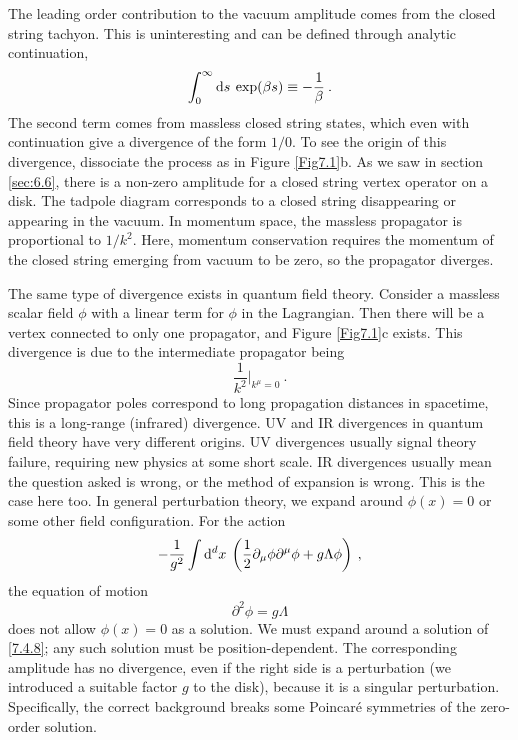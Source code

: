 The leading order contribution to the vacuum amplitude comes from the closed string tachyon. 
This is uninteresting and can be defined through analytic continuation, 
\begin{equation}
	\int_{0}^{\infty} \mathrm{d} s\:  \exp (\beta s) \equiv-\frac{1}{\beta} \:. \label{7.4.5} 
\end{equation}
The second term comes from massless closed string states, which even with continuation give a divergence of the form $1 / 0$. To see the origin of this divergence, dissociate the process as in Figure \ref{Fig7.1}b. As we saw in section \ref{sec:6.6}, there is a non-zero amplitude for a closed string vertex operator on a disk. 
The tadpole diagram corresponds to a closed string disappearing or appearing in the vacuum. In momentum space, the massless propagator is proportional to $1 / k^{2}$. Here, momentum conservation requires the momentum of the closed string emerging from vacuum to be zero, so the propagator diverges. 

The same type of divergence exists in quantum field theory. Consider a massless scalar field $\phi$ with a linear term for $\phi$ in the Lagrangian. Then there will be a vertex connected to only one propagator, and Figure \ref{Fig7.1}c exists. This divergence is due to the intermediate propagator being 
\begin{equation}
	\frac{1}{k^{2}}\bigg|_{k^{\mu}=0} \:. \label{7.4.6} 
\end{equation}
Since propagator poles correspond to long propagation distances in spacetime, this is a long-range (infrared) divergence. 
UV and IR divergences in quantum field theory have very different origins. UV divergences usually signal theory failure, requiring new physics at some short scale. IR divergences usually mean the question asked is wrong, or the method of expansion is wrong. This is the case here too. In general perturbation theory, we expand around $\phi(x)=0$ or some other field configuration. For the action 
\begin{equation}
	-\frac{1}{g^{2}} \int \mathrm{d}^{d} x \: \left(\frac{1}{2} \partial_{\mu} \phi \partial^{\mu} \phi+g \Lambda \phi\right) \:, \label{7.4.7} 
\end{equation}
the equation of motion 
\begin{equation}
	\partial^{2} \phi=g \Lambda \label{7.4.8} 
\end{equation}
does not allow $\phi(x)=0$ as a solution. 
We must expand around a solution of \eqref{7.4.8}; any such solution must be position-dependent. The corresponding amplitude has no divergence, even if the right side is a perturbation (we introduced a suitable factor $g$ to the disk), because it is a singular perturbation. Specifically, the correct background breaks some Poincaré symmetries of the zero-order solution. 

